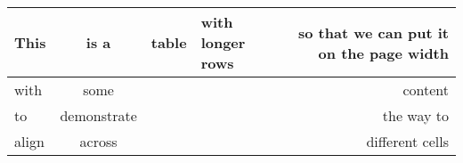 \begin{longtable}[c]{@{}lcllr@{}}
\toprule
This & is a & table & with longer rows & so that we can put it on the
page width\tabularnewline
\midrule
\endhead
with & some & & & content\tabularnewline
to & demonstrate & & & the way to\tabularnewline
align & across & & & different cells\tabularnewline
\bottomrule
\end{longtable}
